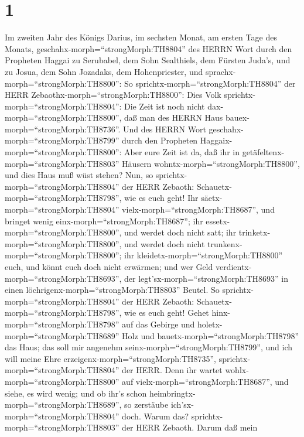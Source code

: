 \hypertarget{section}{%
\section{1}\label{section}}

 Im zweiten Jahr des Königs Darius, im sechsten Monat, am
ersten Tage des Monats, geschahx-morph=``strongMorph:TH8804'' des HERRN
Wort durch den Propheten Haggai zu Serubabel, dem Sohn Sealthiels, dem
Fürsten Juda's, und zu Josua, dem Sohn Jozadaks, dem Hohenpriester, und
sprachx-morph=``strongMorph:TH8800'':  So
sprichtx-morph=``strongMorph:TH8804'' der HERR
Zebaothx-morph=``strongMorph:TH8800'': Dies Volk
sprichtx-morph=``strongMorph:TH8804'': Die Zeit ist noch nicht
dax-morph=``strongMorph:TH8800'', daß man des HERRN Haus
bauex-morph=``strongMorph:TH8736''.  Und des HERRN Wort
geschahx-morph=``strongMorph:TH8799'' durch den Propheten
Haggaix-morph=``strongMorph:TH8800'':  Aber eure Zeit ist
da, daß ihr in getäfeltenx-morph=``strongMorph:TH8803'' Häusern
wohntx-morph=``strongMorph:TH8800'', und dies Haus muß wüst stehen?
 Nun, so sprichtx-morph=``strongMorph:TH8804'' der HERR
Zebaoth: Schauetx-morph=``strongMorph:TH8798'', wie es euch geht!
 Ihr säetx-morph=``strongMorph:TH8804''
vielx-morph=``strongMorph:TH8687'', und bringet wenig
einx-morph=``strongMorph:TH8687''; ihr
essetx-morph=``strongMorph:TH8800'', und werdet doch nicht satt; ihr
trinketx-morph=``strongMorph:TH8800'', und werdet doch nicht
trunkenx-morph=``strongMorph:TH8800''; ihr
kleidetx-morph=``strongMorph:TH8800'' euch, und könnt euch doch nicht
erwärmen; und wer Geld verdientx-morph=``strongMorph:TH8693'', der
legt'sx-morph=``strongMorph:TH8693'' in einen
löchrigenx-morph=``strongMorph:TH8803'' Beutel.  So
sprichtx-morph=``strongMorph:TH8804'' der HERR Zebaoth:
Schauetx-morph=``strongMorph:TH8798'', wie es euch geht! 
Gehet hinx-morph=``strongMorph:TH8798'' auf das Gebirge und
holetx-morph=``strongMorph:TH8689'' Holz und
bauetx-morph=``strongMorph:TH8798'' das Haus; das soll mir angenehm
seinx-morph=``strongMorph:TH8799'', und ich will meine Ehre
erzeigenx-morph=``strongMorph:TH8735'',
sprichtx-morph=``strongMorph:TH8804'' der HERR.  Denn ihr
wartet wohlx-morph=``strongMorph:TH8800'' auf
vielx-morph=``strongMorph:TH8687'', und siehe, es wird wenig; und ob
ihr's schon heimbringtx-morph=``strongMorph:TH8689'', so zerstäube
ich'sx-morph=``strongMorph:TH8804'' doch. Warum das?
sprichtx-morph=``strongMorph:TH8803'' der HERR Zebaoth. Darum daß mein
